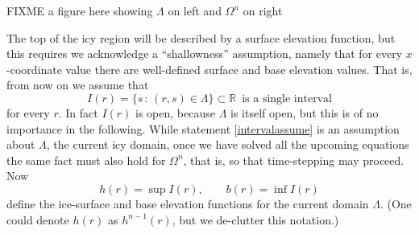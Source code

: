\documentclass[letterpaper,final,12pt,reqno]{amsart}
\newcommand{\RR}{\mathbb{R}}
\begin{document}
FIXME a figure here showing $\Lambda$ on left and $\Omega^n$ on right

The top of the icy region will be described by a surface elevation function, but this requires we acknowledge a ``shallowness'' assumption, namely that for every $x$-coordinate value there are well-defined surface and base elevation values.  That is, from now on we assume that
\begin{equation}
I(r) = \{s\,:\,(r,s) \in \Lambda\} \subset \RR \, \text{ is a single interval}\label{intervalassume}
\end{equation}
for every $r$.  In fact $I(r)$ is open, because $\Lambda$ is itself open, but this is of no importance in the following.  While statement \eqref{intervalassume} is an assumption about $\Lambda$, the current icy domain, once we have solved all the upcoming equations the same fact must also hold for $\Omega^n$, that is, so that time-stepping may proceed.  Now
    $$h(r) = \sup I(r), \qquad b(r) = \inf I(r)$$
define the ice-surface and base elevation functions for the current domain $\Lambda$.  (One could denote $h(r)$ as $h^{n-1}(r)$, but we de-clutter this notation.)
\end{document}
